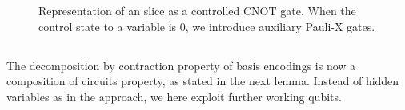 \begin{figure}
    \begin{center}
        
    \end{center}
    \caption{
        Representation of an slice as a controlled $\mathrm{CNOT}$ gate.
        When the control state to a variable is $0$, we introduce auxiliary Pauli-X gates.
    }\label{fig:qcbencodingPolynomial}
\end{figure}

\subsection{\DecompositionSparsity{}}

The decomposition by contraction property of basis encodings is now a composition of circuits property, as stated in the next lemma.
Instead of hidden variables as in the \tnreason{} approach, we here exploit further working qubits.

